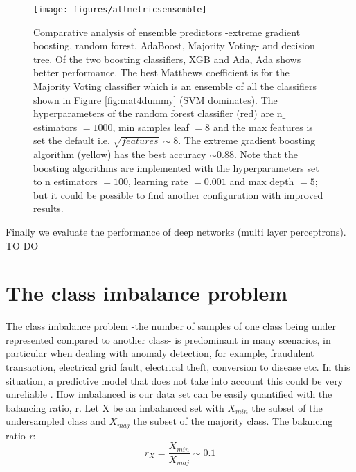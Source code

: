 \documentclass[11pt]{article}
\theoremstyle{definition}
\theoremstyle{remark}
\begin{document}
\begin{figure}[H] 
        \centering
        \texttt{[image: figures/allmetricsensemble]}
        \caption{Comparative analysis of ensemble predictors -extreme gradient boosting, random forest, AdaBoost, Majority Voting- and decision tree. Of the two boosting classifiers, XGB and Ada, Ada shows better performance. The best Matthews coefficient is for the Majority Voting classifier which is an ensemble of all the classifiers shown in Figure \ref{fig:mat4dummy} (SVM dominates). The hyperparameters of the random forest classifier (red) are n$\_$estimators $= 1000$, min$\_$samples$\_$leaf $= 8$ and the max$\_$features is set the default i.e. $\sqrt{features} \sim 8$. The extreme gradient boosting algorithm (yellow) has the best accuracy $\sim 0.88$. Note that the boosting algorithms are implemented with the hyperparameters set to n$\_$estimators $= 100$, learning rate $=0.001$ and max$\_$depth $=5$; but it could be possible to find another configuration with improved results.} \label{fig:allmetricsensemble}
\end{figure}

Finally we evaluate the performance of deep networks (multi layer perceptrons). TO DO


\section{The class imbalance problem}
\label{se:imbalance}
The class imbalance problem -the number of samples of one class being under represented compared to another class- is predominant in many scenarios, in particular when dealing with anomaly detection, for example, fraudulent transaction, electrical grid fault, electrical theft, conversion to disease  etc. In this situation, a predictive model that does not take into account this could be very unreliable \cite{he2009learning}.
How imbalanced is our data set can be easily quantified with the balancing ratio, r. Let X be an imbalanced set with $X_{min}$ the subset of the undersampled class and $X_{maj}$ the subset of the majority class. The balancing ratio \emph{r}:
\begin{equation}
r_X = \frac{X_{min}}{X_{maj}} \sim 0.1
\end{equation}
\end{document}
